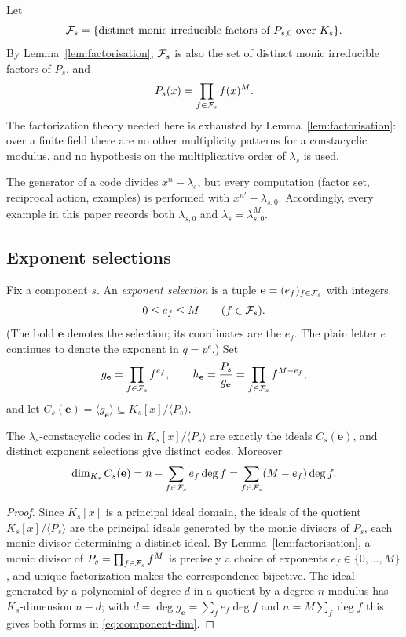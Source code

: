 Let
\[
\mathcal F_s=\{\text{distinct monic irreducible factors of }P_{s,0}\text{ over }K_s\}.
\]
By Lemma~\ref{lem:factorisation}, $\mathcal F_s$ is also the set of distinct monic
irreducible factors of $P_s$, and
\[
P_s(x)=\prod_{f\in\mathcal F_s}f(x)^M .
\]
The factorization theory needed here is exhausted by
Lemma~\ref{lem:factorisation}: over a finite field there are no other
multiplicity patterns for a constacyclic modulus, and no hypothesis on the
multiplicative order of $\lambda_s$ is used.

\begin{remark}\label{rem:lambda0}
The generator of a code divides $x^n-\lambda_s$, but every computation (factor
set, reciprocal action, examples) is performed with $x^{n'}-\lambda_{s,0}$.
Accordingly, every example in this paper records both $\lambda_{s,0}$ and
$\lambda_s=\lambda_{s,0}^M$.
\end{remark}

\subsection{Exponent selections}\label{sec:selections}

Fix a component $s$.  An \emph{exponent selection} is a tuple
$\mathbf{e}=(e_f)_{f\in\mathcal F_s}$ with integers
\[
0\leq e_f\leq M\qquad(f\in\mathcal F_s).
\]
(The bold $\mathbf{e}$ denotes the selection; its coordinates are the $e_f$.
The plain letter $e$ continues to denote the exponent in $q=p^e$.)  Set
\[
g_{\mathbf{e}}=\prod_{f\in\mathcal F_s}f^{e_f},
\qquad
h_{\mathbf{e}}=\frac{P_s}{g_{\mathbf{e}}}
   =\prod_{f\in\mathcal F_s}f^{M-e_f},
\]
and let $C_s(\mathbf{e})=\langle g_{\mathbf{e}}\rangle\subseteq
K_s[x]/\langle P_s\rangle$.

\begin{lemma}\label{lem:component-selection}
The $\lambda_s$-constacyclic codes in $K_s[x]/\langle P_s\rangle$ are exactly
the ideals $C_s(\mathbf{e})$, and distinct exponent selections give distinct
codes.  Moreover
\begin{equation}\label{eq:component-dim}
\dim_{K_s}C_s(\mathbf{e})
   =n-\sum_{f\in\mathcal F_s}e_f\deg f
   =\sum_{f\in\mathcal F_s}(M-e_f)\deg f .
\end{equation}
\end{lemma}

\begin{proof}
Since $K_s[x]$ is a principal ideal domain, the ideals of the quotient
$K_s[x]/\langle P_s\rangle$ are the principal ideals generated by the monic
divisors of $P_s$, each monic divisor determining a distinct ideal.  By
Lemma~\ref{lem:factorisation}, a monic divisor of
$P_s=\prod_{f\in\mathcal F_s}f^M$ is precisely a choice of exponents
$e_f\in\{0,\ldots,M\}$, and unique factorization makes the correspondence
bijective.  The ideal generated by a polynomial of degree $d$ in a quotient by a
degree-$n$ modulus has $K_s$-dimension $n-d$; with
$d=\deg g_{\mathbf{e}}=\sum_f e_f\deg f$ and $n=M\sum_f\deg f$ this gives both
forms in \eqref{eq:component-dim}.
\end{proof}

